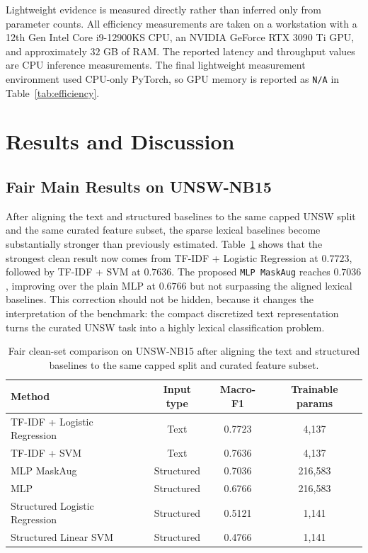 Lightweight evidence is measured directly rather than inferred only from parameter counts. All efficiency measurements are taken on a workstation with a 12th Gen Intel Core i9-12900KS CPU, an NVIDIA GeForce RTX 3090 Ti GPU, and approximately $32$ GB of RAM. The reported latency and throughput values are CPU inference measurements. The final lightweight measurement environment used CPU-only PyTorch, so GPU memory is reported as \texttt{N/A} in Table~\ref{tab:efficiency}.

\section{Results and Discussion}
\subsection{Fair Main Results on UNSW-NB15}
After aligning the text and structured baselines to the same capped UNSW split and the same curated feature subset, the sparse lexical baselines become substantially stronger than previously estimated. Table~\ref{tab:main_clean} shows that the strongest clean result now comes from TF-IDF + Logistic Regression at $0.7723$, followed by TF-IDF + SVM at $0.7636$. The proposed \texttt{MLP MaskAug} reaches $0.7036$, improving over the plain MLP at $0.6766$ but not surpassing the aligned lexical baselines. This correction should not be hidden, because it changes the interpretation of the benchmark: the compact discretized text representation turns the curated UNSW task into a highly lexical classification problem.

\begin{table}[t]
\centering
\caption{Fair clean-set comparison on UNSW-NB15 after aligning the text and structured baselines to the same capped split and curated feature subset.}
\label{tab:main_clean}
\begin{tabular}{lccc}
\toprule
Method & Input type & Macro-F1 & Trainable params \\
\midrule
TF-IDF + Logistic Regression & Text & 0.7723 & 4,137 \\
TF-IDF + SVM & Text & 0.7636 & 4,137 \\
MLP MaskAug & Structured & 0.7036 & 216,583 \\
MLP & Structured & 0.6766 & 216,583 \\
Structured Logistic Regression & Structured & 0.5121 & 1,141 \\
Structured Linear SVM & Structured & 0.4766 & 1,141 \\
\bottomrule
\end{tabular}
\end{table}


